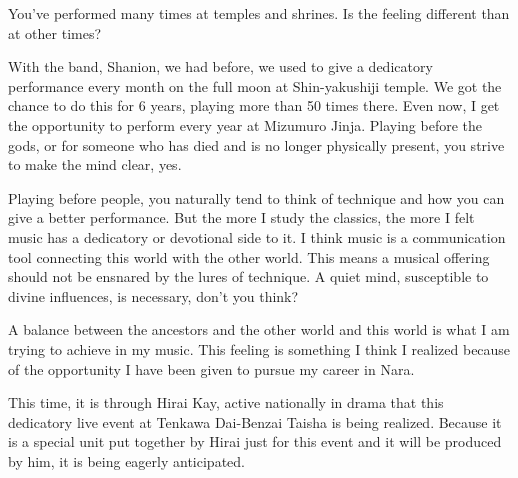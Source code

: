 
\begin{drama}

\par
\par

 You've performed many times at temples and shrines. Is the feeling different than at other times?

\par
\par

 With the band, Shanion, we had before, we used to give a dedicatory performance every month on the full moon at Shin-yakushiji temple. We got the chance to do this for 6 years, playing more than 50 times there. Even now, I get the opportunity to perform every year at Mizumuro Jinja. Playing before the gods, or for someone who has died and is no longer physically present, you strive to make the mind clear, yes.

\par
\par

Playing before people, you naturally tend to think of technique and how you can give a better performance. But the more I study the classics, the more I felt music has a dedicatory or devotional side to it. I think music is a communication tool connecting this world with the other world. This means a musical offering should not be ensnared by the lures of technique. A quiet mind, susceptible to divine influences, is necessary, don't you think?

\par
\par

A balance between the ancestors and the other world and this world is what I am trying to achieve in my music. This feeling is something I think I realized because of the opportunity I have been given to pursue my career in Nara.

\par
\par

 This time, it is through Hirai Kay, active nationally in drama that this dedicatory live event at Tenkawa Dai-Benzai Taisha is being realized. Because it is a special unit put together by Hirai just for this event and it will be produced by him, it is being eagerly anticipated.


\end{drama}
